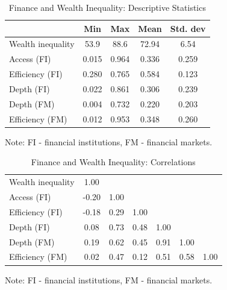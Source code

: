 \documentclass[a4paper,11pt]{article}
\begin{document}
%
%
\begin{table}[ht!]
\small
\centering
\caption{Finance and Wealth Inequality: Descriptive Statistics}
\label{tab:descstat}
\begin{threeparttable}
\begin{tabular}{lcccc}
  \toprule
							& Min & Max & Mean & Std. dev \\ 
  \midrule
  Wealth inequality	& 53.9 & 88.6 &  72.94 & 6.54  \\ 
  Access (FI)		& 0.015 & 0.964 & 0.336 & 0.259 \\ 
  Efficiency (FI)   & 0.280 & 0.765 & 0.584 & 0.123 \\ 
  Depth (FI)		& 0.022 & 0.861 & 0.306 & 0.239 \\ 
  Depth (FM) 		& 0.004 & 0.732 & 0.220 & 0.203 \\ 
  Efficiency (FM)	& 0.012 & 0.953 & 0.348 & 0.260 \\ 
  \bottomrule
\end{tabular}
\begin{tablenotes}
\small
\item Note: FI - financial institutions, FM - financial markets.
\end{tablenotes}
\end{threeparttable}
\end{table}

%
%
\begin{table}[ht!]
\small
\centering
\caption{Finance and Wealth Inequality: Correlations}
\label{tab:corrmat}
\begin{threeparttable}
\begin{tabular}{lcccccc}
  \toprule
  Wealth inequality & 1.00 &  & & & & \\
  Access (FI)  & -0.20 & 1.00 &  & & &    \\ 
  Efficiency (FI) & -0.18 & 0.29 & 1.00 & & &  \\ 
  Depth (FI)  & 0.08 & 0.73 & 0.48 & 1.00 &  &   \\ 
  Depth (FM)  & 0.19 & 0.62 & 0.45 & 0.91 & 1.00 &   \\ 
  Efficiency (FM)  & 0.02 & 0.47 & 0.12 & 0.51 & 0.58 & 1.00   \\ 
  \bottomrule
\end{tabular}
\begin{tablenotes}
\small
\item Note: FI - financial institutions, FM - financial markets.
\end{tablenotes}
\end{threeparttable}
\end{table}
%
%
\end{document}
